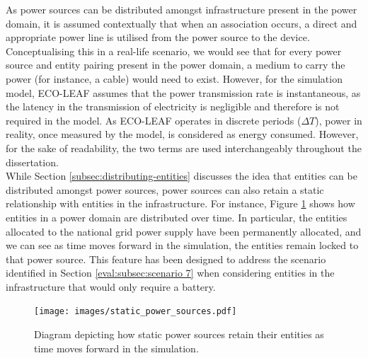 \documentclass{l4proj}
\begin{document}
As power sources can be distributed amongst infrastructure present in the power domain, it is assumed contextually that when an association occurs, a direct and appropriate power line is utilised from the power source to the device.
Conceptualising this in a real-life scenario, we would see that for every power source and entity pairing present in the power domain, a medium to carry the power (for instance, a cable) would need to exist.
However, for the simulation model, ECO-LEAF assumes that the power transmission rate is instantaneous, as the latency in the transmission of electricity is negligible \citep{speed-of-electricity} and therefore is not required in the model.
As ECO-LEAF operates in discrete periods ($\varDelta T$), power in reality, once measured by the model, is considered as energy consumed.
However, for the sake of readability, the two terms are used interchangeably throughout the dissertation.\\

While Section \ref{subsec:distributing-entities} discusses the idea that entities can be distributed amongst power sources, power sources can also retain a static relationship with entities in the infrastructure.
For instance, Figure \ref{fig:staticPower} shows how entities in a power domain are distributed over time.
In particular, the entities allocated to the national grid power supply have been permanently allocated, and we can see as time moves forward in the simulation, the entities remain locked to that power source.
This feature has been designed to address the scenario identified in Section \ref{eval:subsec:scenario 7} when considering entities in the infrastructure that would only require a battery.

\begin{figure}[h]
    \centering
    \texttt{[image: images/static\_power\_sources.pdf]}
    ~
    \caption{Diagram depicting how static power sources retain their entities as time moves forward in the simulation.}
    \label{fig:staticPower}
\end{figure}
\end{document}

